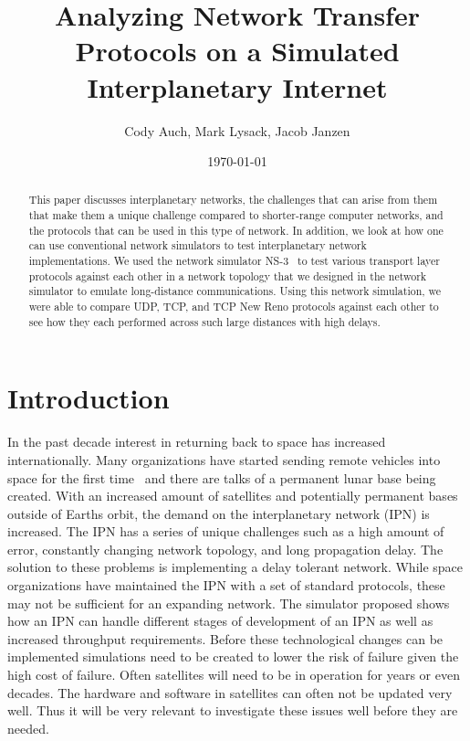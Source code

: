 \documentclass[a4paper,12pt]{article}
\title{Analyzing Network Transfer Protocols on a Simulated Interplanetary Internet}
\author{Cody Auch, Mark Lysack, Jacob Janzen}
\date{\today}
\begin{document}
\maketitle

\begin{abstract}
  This paper discusses interplanetary networks, the challenges that can arise
  from them that make them a unique challenge compared to shorter-range computer
  networks, and the protocols that can be used in this type of network. In
  addition, we look at how one can use conventional network simulators to test
  interplanetary network implementations. We used the network simulator
  NS-3~\cite{ns-3} to test various transport layer protocols against each other
  in a network topology that we designed in the network simulator to emulate
  long-distance communications. Using this network simulation, we were able to
  compare UDP, TCP, and TCP New Reno protocols against each other to see how
  they each performed across such large distances with high delays.
\end{abstract}

\section{Introduction}

In the past decade interest in returning back to space has increased
internationally. Many organizations have started sending remote vehicles into
space for the first time~%
and there are talks of a permanent lunar base being created. With an increased
amount of satellites and potentially permanent bases outside of Earths orbit,
the demand on the interplanetary network (IPN) is increased. The IPN has a
series of unique challenges such as a high amount of error, constantly changing
network topology, and long propagation delay. The solution to these problems is
implementing a delay tolerant network. While space organizations have maintained
the IPN with a set of standard protocols, these may not be sufficient for an
expanding network. The simulator proposed shows how an IPN can handle different
stages of development of an IPN as well as increased throughput requirements.
Before these technological changes can be implemented simulations need to be
created to lower the risk of failure given the high cost of failure. Often
satellites will need to be in operation for years or even decades. The hardware
and software in satellites can often not be updated very well. Thus it will be
very relevant to investigate these issues well before they are needed.
\end{document}
